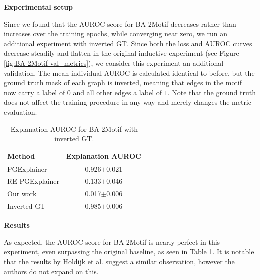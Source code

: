 \textbf{Experimental setup}\par
Since we found that the AUROC score for BA-2Motif decreases rather than increases over the training epochs, while converging near zero, we run an additional experiment with inverted  GT. Since both the loss and AUROC curves decrease steadily and flatten in the original inductive experiment (see Figure \ref{fig:BA-2Motif-val_metrics}), we consider this experiment an additional validation.
The mean individual AUROC is calculated identical to before, but the ground truth mask of each graph is inverted, meaning that edges in the motif now carry a label of $0$ and all other edges a label of $1$. 
Note that the ground truth does not affect the training procedure in any way and merely changes the metric evaluation. \bigskip

\begin{table}[ht]
    \centering
    \scriptsize
    \begin{tabularx}{0.45\textwidth}{l c}
        \toprule
        \textbf{Method} & \textbf{Explanation AUROC} \\
        \midrule
        PGExplainer       & 0.926$\pm$0.021 \\
        RE-PGExplainer       & 0.133$\pm$0.046 \\
        Our work       & 0.017$\pm$0.006 \\
        \midrule
        Inverted GT     & 0.985$\pm$0.006 \\
        \bottomrule
    \end{tabularx}
    \caption[Inductive performance on BA-2Motif with inverted ground truth]{Explanation AUROC for BA-2Motif with inverted GT.}
    \label{tab:flippedGT}
\end{table}
\textbf{Results} \par

As expected, the AUROC score for BA-2Motif is nearly perfect in this experiment, even surpassing the original baseline, as seen in Table \ref{tab:flippedGT}. It is notable that the results by Holdijk et al. \cite{holdijk2021re} suggest a similar observation, however the authors do not expand on this.


